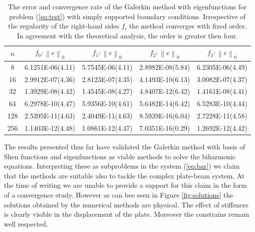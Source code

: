\documentclass{marine_2015}
\newcommand{\norm}[1]{\ensuremath{\left\|#1\right\|}}
\begin{document}
\begin{table}[t!]
    \begin{center}
    \begin{tabular}{ccccc}
\hline
$n$  &  $f_0: \norm{e}_0$  & $f_1: \norm{e}_0$ & $f_2: \norm{e}_0$ & $f_3: \norm{e}_0$\\
\hline
8    & 6.1251E-06(4.11) & 5.7545E-06(4.11) & 2.8982E-08(5.84)& 6.2305E-06(4.49) \\
16   & 2.9912E-07(4.36) & 2.8123E-07(4.35) & 4.1493E-10(6.13)& 3.0082E-07(4.37) \\
32   & 1.3929E-08(4.42) & 1.4545E-08(4.27) & 4.8407E-12(6.42)& 1.4161E-08(4.41) \\
64   & 6.2978E-10(4.47) & 5.9356E-10(4.61) & 5.6482E-14(6.42)& 6.5283E-10(4.44) \\
128  & 2.5395E-11(4.63) & 2.4049E-11(4.63) & 8.5939E-16(6.04)& 2.7228E-11(4.58) \\
256  & 1.1403E-12(4.48) & 1.0861E-12(4.47) & 7.0351E-16(0.29)& 1.2692E-12(4.42) \\
\hline
\hline
    \end{tabular}
    \caption{The error and convergence rate of the Galerkin method with eigenfunctions for
    problem (\ref{eq:test}) with simply supported boundary conditions.
  Irrespective of the regularity of the right-hand sides $f_i$ the method
converges with fixed order. In agreement with the theoretical analysis, the
order is greater then four.}
  \label{tab:sine_convergence}
  \end{center}
  \end{table}

  The results presented thus far have validated the Galerkin method with basis
  of Shen functions and eigenfunctions as viable methods to solve the biharmonic
  equations. Interpreting these as subproblems in the system (\ref{eq:bar}) we
  claim that the methods are suitable also to tackle the complex plate-beam system.
  At the time of writing we are unable to provide a support for this claim in
  the form of a convergence study. However as can bee seen in Figure \ref{fig:solutions} 
  the solutions obtained by the numerical methods are physical. The effect of
  stiffeners is clearly visible in the displacement of the plate. Moreover the 
  constrains remain well respected.
\end{document}

